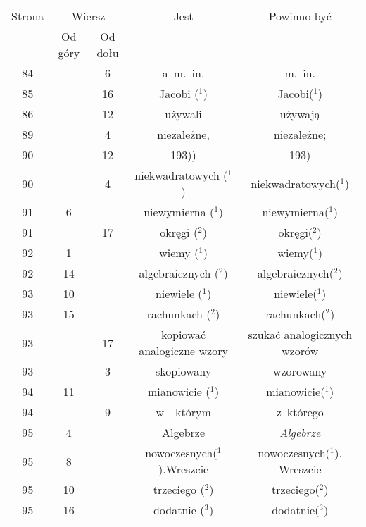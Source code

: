 \documentclass[a4paper,11pt]{article}
\numberwithin{equation}{section}
\begin{document}
\begin{center}
  \begin{tabular}{|c|c|c|c|c|}
    \hline
    Strona & \multicolumn{2}{c|}{Wiersz} & Jest
                              & Powinno być \\ \cline{2-3}
    & Od góry & Od dołu & & \\
    \hline
    \hphantom{0}84 & & \hphantom{0}6 & a~m.~in. & m.~in. \\
    \hphantom{0}85 & & 16 & Jacobi ($^{ 1 }$) & Jacobi($^{ 1 }$) \\
    \hphantom{0}86 & & 12 & używali & używają \\
    \hphantom{0}89 & & \hphantom{0}4 & niezależne, & niezależne; \\
    \hphantom{0}90 & & 12 & 193)) & 193) \\
    \hphantom{0}90 & & \hphantom{0}4 & niekwadratowych ($^{ 1 }$)
    & niekwadratowych($^{ 1 }$) \\
    \hphantom{0}91 & \hphantom{0}6 & & niewymierna ($^{ 1 }$)
    & niewymierna($^{ 1 }$) \\
    \hphantom{0}91 & & 17 & okręgi ($^{ 2 }$) & okręgi($^{ 2 }$) \\
    \hphantom{0}92 & \hphantom{0}1 & & wiemy ($^{ 1 }$) & wiemy($^{ 1 }$) \\
    \hphantom{0}92 & 14 & & algebraicznych ($^{ 2 }$)
    & algebraicznych($^{ 2 }$) \\
    \hphantom{0}93 & 10 & & niewiele ($^{ 1 }$) & niewiele($^{ 1 }$) \\
    \hphantom{0}93 & 15 & & rachunkach ($^{ 2 }$) & rachunkach($^{ 2 }$) \\
    \hphantom{0}93 & & 17 & kopiować analogiczne wzory
    & szukać analogicznych wzorów \\
    \hphantom{0}93 & & \hphantom{0}3 & skopiowany & wzorowany \\
    \hphantom{0}94 & 11 & & mianowicie ($^{ 1 }$) & mianowicie($^{ 1 }$) \\
    \hphantom{0}94 & & \hphantom{0}9 & w~~którym & z~którego \\
    \hphantom{0}95 & \hphantom{0}4 & & Algebrze & \textit{Algebrze} \\
    \hphantom{0}95 & \hphantom{0}8 & & nowoczesnych($^{ 1 }$).Wreszcie
    & nowoczesnych($^{ 1 }$). Wreszcie \\
    \hphantom{0}95 & 10 & & trzeciego ($^{ 2 }$) & trzeciego($^{ 2 }$) \\
    \hphantom{0}95 & 16 & & dodatnie ($^{ 3 }$) & dodatnie($^{ 3 }$) \\

\end{tabular}
\end{center}
\end{document}
